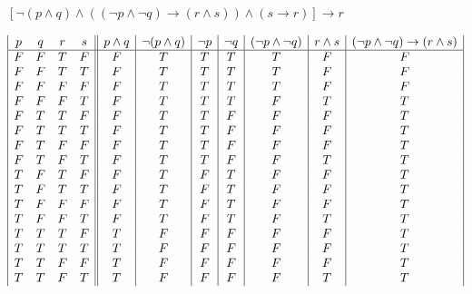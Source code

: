 \documentclass[11pt,a4paper]{article}
\begin{document}
\begin{enumerate}
\begin{center}

$[\neg (p \wedge q) \wedge ((\neg p \wedge \neg q) \rightarrow (r \wedge s)) \wedge (s \rightarrow r)] \rightarrow r $

\end{center}

\begin{displaymath}
\begin{array}{|c c c c||c|c|c|c|c|c|c|}
p & q & r & s & p \wedge q & \neg(p \wedge q) & \neg p & \neg q & (\neg p \wedge \neg q) & r \wedge s & (\neg p \wedge \neg q) \rightarrow (r \wedge s) \\
\hline 
F & F & T & F & F & T & T & T & T & F & F\\
F & F & T & T & F & T & T & T & T & F & F\\
F & F & F & F & F & T & T & T & T & F & F\\
F & F & F & T & F & T & T & T & F & T & T\\
F & T & T & F & F & T & T & F & F & F & T\\
F & T & T & T & F & T & T & F & F & F & T\\
F & T & F & F & F & T & T & F & F & F & T\\
F & T & F & T & F & T & T & F & F & T & T\\
T & F & T & F & F & T & F & T & F & F & T\\
T & F & T & T & F & T & F & T & F & F & T\\
T & F & F & F & F & T & F & T & F & F & T\\
T & F & F & T & F & T & F & T & F & T & T\\
T & T & T & F & T & F & F & F & F & F & T\\
T & T & T & T & T & F & F & F & F & F & T\\
T & T & F & F & T & F & F & F & F & F & T\\
T & T & F & T & T & F & F & F & F & T & T\\
\end{array}
\end{displaymath}







\end{enumerate}
\end{document}
